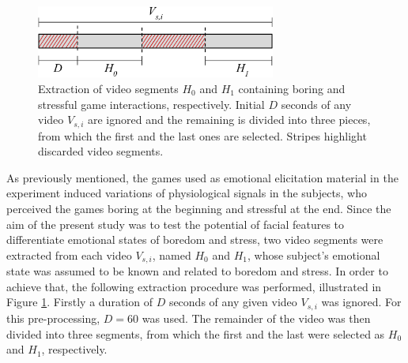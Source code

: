 \begin{figure}
\centering
\includegraphics[width=0.7\textwidth]{Content/figures/pre-processing}
\caption{Extraction of video segments $H_0$ and $H_1$ containing boring and stressful game interactions, respectively. Initial $D$ seconds of any video $V_{s,i}$ are ignored and the remaining is divided into three pieces, from which the first and the last ones are selected. Stripes highlight discarded video segments.}
\label{fig:preprocessing}
\end{figure}

As previously mentioned, the games used as emotional elicitation material in the experiment induced variations of physiological signals in the subjects, who perceived the games boring at the beginning and stressful at the end. Since the aim of the present study was to test the potential of facial features to differentiate emotional states of boredom and stress, two video segments were extracted from each video $V_{s,i}$, named $H_0$ and $H_1$, whose subject's emotional state was assumed to be known and related to boredom and stress. In order to achieve that, the following extraction procedure was performed, illustrated in Figure \ref{fig:preprocessing}. Firstly a duration of $D$ seconds of any given video $V_{s,i}$ was ignored. For this pre-processing, $D=60$ was used. The remainder of the video was then divided into three segments, from which the first and the last were selected as $H_0$ and $H_1$, respectively.

